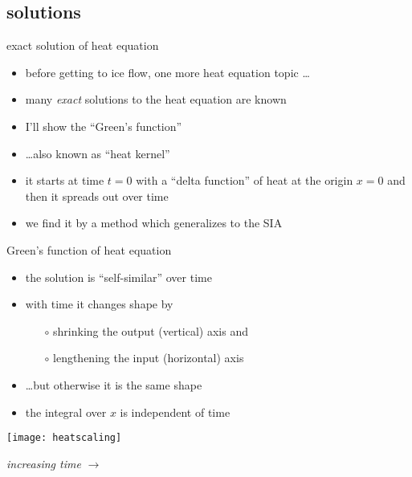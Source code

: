 \subsection{solutions}

\begin{frame}{exact solution of heat equation}

\begin{itemize}
\item before getting to ice flow, one more heat equation topic \dots
\vspace{5mm}

\item many \emph{exact} solutions to the heat equation are known
\item I'll show the ``Green's function''
\item \dots also known as ``heat kernel''
\item it starts at time $t=0$ with a ``delta function'' of heat at the origin $x=0$ and then it spreads out over time
\item we find it by a method which generalizes to the SIA
\end{itemize}
\end{frame}


\begin{frame}{Green's function of heat equation}

\begin{itemize}
\item the solution is ``self-similar'' over time
\item with time it changes shape by
  \begin{itemize}
  \item[$\circ$] shrinking the output (vertical) axis and
  \item[$\circ$] lengthening the input (horizontal) axis
  \end{itemize}
\item \dots but otherwise it is the same shape
\item the integral over $x$ is independent of time
\end{itemize}

\begin{center}
\texttt{[image: heatscaling]}

\emph{increasing time} \Large $\to$
\end{center}
\end{frame}


